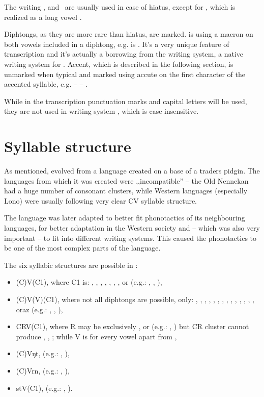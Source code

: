 \skipline

The writing ,  and~ are usually used in case of hiatus,
except for , which is realized as a long vowel .

Diphtongs, as they are more rare than hiatus, are marked.  is using
a macron on both vowels included in a diphtong, e.g.  is . It's a
very unique feature of transcription and it's actually a borrowing from the
 writing system, a native writing system for \andro. Accent, which
is described in the following section, is unmarked when typical and marked using
accute on the first character of the accented syllable, e.g. 
--  -- .

While in the transcription punctuation marks and capital letters will be used,
they are not used in writing system , which is case insensitive.

\section{Syllable structure}

As mentioned, \andro evolved from a language created on a base of a traders
pidgin. The languages from which it was created were ,,incompatible'' -- the Old
Nennekan had a huge number of consonant clusters, while Western languages
(especially Lono) were usually following very clear CV syllable structure.

The language was later adapted to better fit phonotactics of its neighbouring
languages, for better adaptation in the Western society and -- which was also
very important -- to fit into different writing systems. This caused the
phonotactics to be one of the most complex parts of the language.

The six syllabic structures are possible in \andro:

\begin{itemize}
    \item (C)V(C1), where C1 is: , , , , , , ,  or  (e.g.: , , ),
    \item (C)V(V)(C1), where not all diphtongs are possible, only: , , , , , , , , , , , , , ,  oraz  (e.g.: , , ),
    \item CRV(C1), where R may be exclusively ,  or  (e.g.: , ) but CR cluster cannot produce , , ; while V is for every vowel apart from ,
    \item (C)Vŋt, (e.g.: , ),
    \item (C)Vrn, (e.g.: , ),
    \item stV(C1), (e.g.: , ).
\end{itemize}


